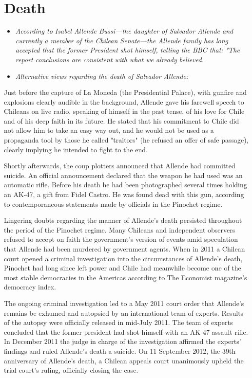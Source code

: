 \section{Death}\label{death}

\begin{itemize}
\item
  \emph{According to Isabel Allende Bussi---the daughter of Salvador
  Allende and currently a member of the Chilean Senate---the Allende
  family has long accepted that the former President shot himself,
  telling the BBC that: "The report conclusions are consistent with what
  we already believed.}
\item
  \emph{Alternative views regarding the death of Salvador Allende:}
\end{itemize}

Just before the capture of La Moneda (the Presidential Palace), with
gunfire and explosions clearly audible in the background, Allende gave
his farewell speech to Chileans on live radio, speaking of himself in
the past tense, of his love for Chile and of his deep faith in its
future. He stated that his commitment to Chile did not allow him to take
an easy way out, and he would not be used as a propaganda tool by those
he called "traitors" (he refused an offer of safe passage), clearly
implying he intended to fight to the end.

Shortly afterwards, the coup plotters announced that Allende had
committed suicide. An official announcement declared that the weapon he
had used was an automatic rifle. Before his death he had been
photographed several times holding an AK-47, a gift from Fidel Castro.
He was found dead with this gun, according to contemporaneous statements
made by officials in the Pinochet regime.

Lingering doubts regarding the manner of Allende's death persisted
throughout the period of the Pinochet regime. Many Chileans and
independent observers refused to accept on faith the government's
version of events amid speculation that Allende had been murdered by
government agents. When in 2011 a Chilean court opened a criminal
investigation into the circumstances of Allende's death, Pinochet had
long since left power and Chile had meanwhile become one of the most
stable democracies in the Americas according to The Economist magazine's
democracy index.

The ongoing criminal investigation led to a May 2011 court order that
Allende's remains be exhumed and autopsied by an international team of
experts. Results of the autopsy were officially released in mid-July
2011. The team of experts concluded that the former president had shot
himself with an AK-47 assault rifle. In December 2011 the judge in
charge of the investigation affirmed the experts' findings and ruled
Allende's death a suicide. On 11 September 2012, the 39th anniversary of
Allende's death, a Chilean appeals court unanimously upheld the trial
court's ruling, officially closing the case.

